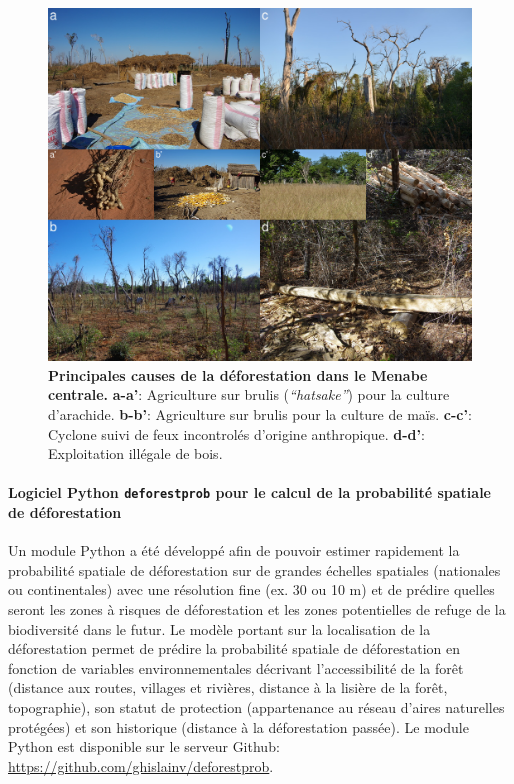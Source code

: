 \documentclass[12pt,]{article}
\let\oldparagraph\paragraph
\renewcommand{\paragraph}[1]{\oldparagraph{#1}\mbox{}}
\begin{document}
\begin{figure}[H]

{\centering \includegraphics[width=\textwidth]{figures/causes} 

}

\caption{\textbf{Principales causes de la déforestation dans le
Menabe centrale.} \textbf{a-a'}: Agriculture sur brulis
(\emph{``hatsake''}) pour la culture d'arachide. \textbf{b-b'}:
Agriculture sur brulis pour la culture de maïs. \textbf{c-c'}: Cyclone
suivi de feux incontrolés d'origine anthropique. \textbf{d-d'}:
Exploitation illégale de bois.}\label{fig:causes}
\end{figure}

\hypertarget{logiciel-python-deforestprob-pour-le-calcul-de-la-probabilite-spatiale-de-deforestation}{%
\paragraph{\texorpdfstring{Logiciel Python \texttt{deforestprob} pour le
calcul de la probabilité spatiale de
déforestation}{Logiciel Python deforestprob pour le calcul de la probabilité spatiale de déforestation}}\label{logiciel-python-deforestprob-pour-le-calcul-de-la-probabilite-spatiale-de-deforestation}}

Un module Python a été développé afin de pouvoir estimer rapidement la
probabilité spatiale de déforestation sur de grandes échelles spatiales
(nationales ou continentales) avec une résolution fine (ex. 30 ou 10 m)
et de prédire quelles seront les zones à risques de déforestation et les
zones potentielles de refuge de la biodiversité dans le futur. Le modèle
portant sur la localisation de la déforestation permet de prédire la
probabilité spatiale de déforestation en fonction de variables
environnementales décrivant l'accessibilité de la forêt (distance aux
routes, villages et rivières, distance à la lisière de la forêt,
topographie), son statut de protection (appartenance au réseau d'aires
naturelles protégées) et son historique (distance à la déforestation
passée). Le module Python est disponible sur le serveur Github:
\url{https://github.com/ghislainv/deforestprob}.
\end{document}
